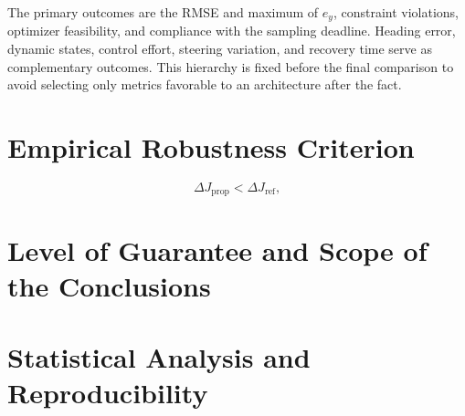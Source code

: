 \documentclass[12pt,a4paper]{report}
\begin{document}
The primary outcomes are the RMSE and maximum of $e_y$, constraint violations, optimizer feasibility, and compliance with the sampling deadline. Heading error, dynamic states, control effort, steering variation, and recovery time serve as complementary outcomes. This hierarchy is fixed before the final comparison to avoid selecting only metrics favorable to an architecture after the fact.

\section{Empirical Robustness Criterion}

\begin{equation}
\Delta J_{\mathrm{prop}} < \Delta J_{\mathrm{ref}},
\end{equation}
%

\section{Level of Guarantee and Scope of the Conclusions}

%
%
%

\section{Statistical Analysis and Reproducibility}

\end{document}
